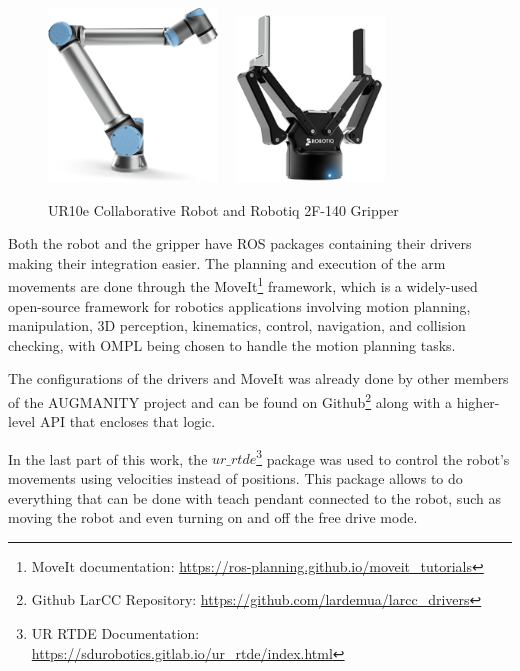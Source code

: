 \begin{figure}[ht]
    \centerline{\includegraphics[width=0.4\textwidth]{figs/UR10e.jpg} \ \ \includegraphics[width=0.35\textwidth]{figs/robotiq-2f-140.jpg}}
    \caption[UR10e Collaborative Robot and Robotiq 2F-140 Gripper]{UR10e Collaborative Robot \cite{UR10e_image} and Robotiq 2F-140 Gripper \cite{robotiq_gripper}}
    \label{fig:ur10e}
\end{figure}

Both the robot and the gripper have ROS packages containing their drivers making their integration easier. The planning and execution of the arm movements are done through the MoveIt\footnote{MoveIt documentation: \url{https://ros-planning.github.io/moveit_tutorials}} framework, which is a widely-used open-source framework for robotics applications involving motion planning, manipulation, 3D perception, kinematics, control, navigation, and collision checking, with OMPL being chosen to handle the motion planning tasks.

The configurations of the drivers and MoveIt was already done by other members of the AUGMANITY project and can be found on Github\footnote{Github LarCC Repository: \url{https://github.com/lardemua/larcc_drivers}} along with a higher-level API that encloses that logic.

In the last part of this work, the $ur\_rtde$\footnote{UR RTDE Documentation: \url{https://sdurobotics.gitlab.io/ur_rtde/index.html}} package was used to control the robot's movements using velocities instead of positions. This package allows to do everything that can be done with teach pendant connected to the robot, such as moving the robot and even turning on and off the free drive mode.


